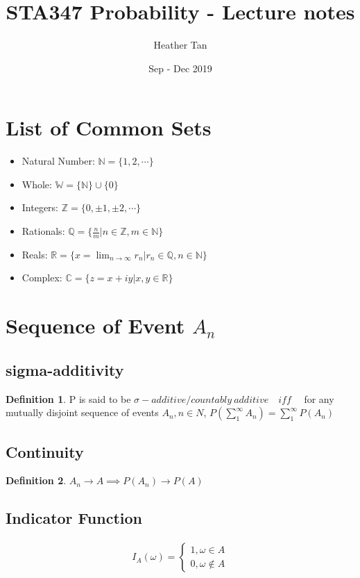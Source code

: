 \documentclass{article}
\title{STA347 Probability - Lecture notes}
\author{Heather Tan}
\date{Sep - Dec 2019}
\theoremstyle{definition}
\newtheorem{definition}{Definition}[section]
\theoremstyle{thrm}
\theoremstyle{lma}
\theoremstyle{ppst}
\theoremstyle{crlr}
\begin{document}
\maketitle	
\tableofcontents
\pagebreak

\section{List of Common Sets}
\begin{itemize}
	\item Natural Number: $\mathbb{N} = \{1,2,\cdots\}$
	\item Whole: $\mathbb{W} = \{\mathbb{N}\} \cup \{0\}$
	\item Integers: $\mathbb{Z} = \{0, \pm1, \pm2,\cdots\}$
	\item Rationals: $\mathbb{Q} = \{\frac{n}{m}  | n \in \mathbb{Z}, m \in \mathbb{N}\}$
	\item Reals: $\mathbb{R} = \{x = \lim_{n\to\infty} r_n | r_n \in \mathbb{Q}, n \in \mathbb{N}\}$
	\item Complex: $\mathbb{C} = \{z = x+iy|x,y\in \mathbb{R}\}$
\end{itemize}
\section{Sequence of Event $A_n$}
\subsection{sigma-additivity}
\begin{definition}
	P is said to be $\sigma-additive/countably \ additive\quad \textit{iff}\quad $ for any mutually disjoint sequence of events $A_n, n\in N$, $P(\sum_{1}^\infty A_n) = \sum_1^\infty P(A_n)$ 
\end{definition}
\subsection{Continuity}
\begin{definition}
	$A_n \to A \implies P(A_n) \to P(A)$
\end{definition}
\subsection{Indicator Function}
\begin{align*}
	I_A(\omega) = \begin{cases}
		1, \omega \in A\\
		0, \omega \notin A
	\end{cases}
\end{align*}
\end{document}

